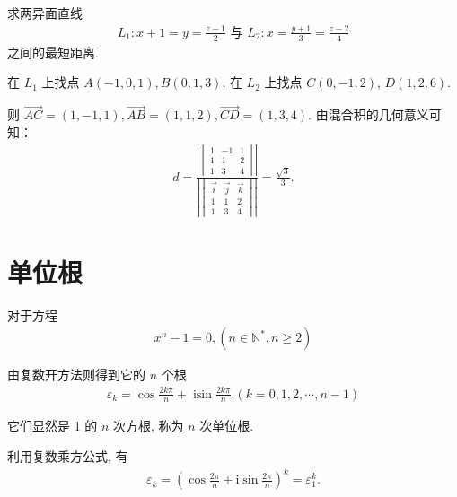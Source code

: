 \begin{exercise}
	求两异面直线
	\begin{align*}
		L_1: x+1=y=\frac{z-1}{2} \text { 与 } L_2: x=\frac{y+1}{3}=\frac{z-2}{4}
	\end{align*}
	之间的最短距离.
\end{exercise}
\begin{solution}
	在 $L_1$ 上找点 $A(-1,0,1), B(0,1,3)$, 在 $L_2$ 上找点 $C(0,-1,2)$, $D(1,2,6)$.

	则 $\overrightarrow{A C}=(1,-1,1), \overrightarrow{A B}=(1,1,2), \overrightarrow{C D}=(1,3,4)$. 由混合积的几何意义可知：
	\begin{align*}
		d=\frac{\left| \begin{vmatrix}
				               1 & -1 & 1 \\
				               1 & 1  & 2 \\
				               1 & 3  & 4
			               \end{vmatrix} \right|}{\left| \begin{vmatrix}
				                                             \vec{i} & \vec{j} & \vec{k} \\
				                                             1       & 1       & 2       \\
				                                             1       & 3       & 4
			                                             \end{vmatrix} \right|}=\frac{\sqrt{3}}{3} .
	\end{align*}
\end{solution}


\section{单位根}
对于方程
\begin{align*}
	x^n-1=0,\left(n \in \mathbb{N}^*, n \geqslant 2\right)
\end{align*}

由复数开方法则得到它的 $n$ 个根
\begin{align*}
	\varepsilon_k=\cos \frac{2 k \pi}{n}+\operatorname{isin} \frac{2 k \pi}{n} .(k=0,1,2, \cdots, n-1)
\end{align*}

它们显然是 1 的 $n$ 次方根, 称为 $n$ 次单位根.

利用复数乘方公式, 有
\begin{align*}
	\varepsilon_k=\left(\cos \frac{2 \pi}{n}+\mathrm{i} \sin \frac{2 \pi}{n}\right)^k=\varepsilon_1^k .
\end{align*}

